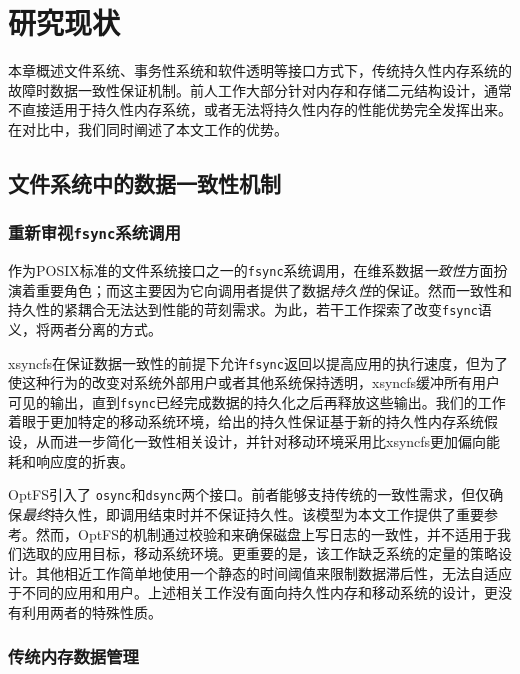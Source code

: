 \chapter{研究现状}
\label{chap:related}

本章概述文件系统、事务性系统和软件透明等接口方式下，传统持久性内存系统的故障时数据一致性保证机制。前人工作大部分针对内存和存储二元结构设计，通常不直接适用于持久性内存系统，或者无法将持久性内存的性能优势完全发挥出来。在对比中，我们同时阐述了本文工作的优势。

\section{文件系统中的数据一致性机制}

\subsection{重新审视\texttt{fsync}系统调用}

作为POSIX标准的文件系统接口之一的\texttt{fsync}系统调用，在维系数据\emph{一致性}方面扮演着重要角色；而这主要因为它向调用者提供了数据\emph{持久性}的保证。然而一致性和持久性的紧耦合无法达到性能的苛刻需求。为此，若干工作探索了改变\texttt{fsync}语义，将两者分离的方式。

xsyncfs\cite{Nightingale:2006:RS:1298455.1298457}在保证数据一致性的前提下允许\texttt{fsync}返回以提高应用的执行速度，但为了使这种行为的改变对系统外部用户或者其他系统保持透明，xsyncfs缓冲所有用户可见的输出，直到\texttt{fsync}已经完成数据的持久化之后再释放这些输出。我们的工作着眼于更加特定的移动系统环境，给出的持久性保证基于新的持久性内存系统假设，从而进一步简化一致性相关设计，并针对移动环境采用比xsyncfs更加偏向能耗和响应度的折衷。

OptFS\cite{Chidambaram:2013:OCC:2517349.2522726}引入了
\texttt{osync}和\texttt{dsync}两个接口。前者能够支持传统的一致性需求，但仅确保\emph{最终}持久性，即调用结束时并不保证持久性。该模型为本文工作提供了重要参考。然而，OptFS的机制通过校验和来确保磁盘上写日志的一致性，并不适用于我们选取的应用目标，移动系统环境。更重要的是，该工作缺乏系统的定量的策略设计。其他相近工作\cite{Ma:2011:LPF:1989323.1989325,
Mickens:2014:BFC:2616448.2616473, Ports:2010:TCA:1924943.1924963}简单地使用一个静态的时间阈值来限制数据滞后性，无法自适应于不同的应用和用户。上述相关工作没有面向持久性内存和移动系统的设计，更没有利用两者的特殊性质。

\subsection{传统内存数据管理}

